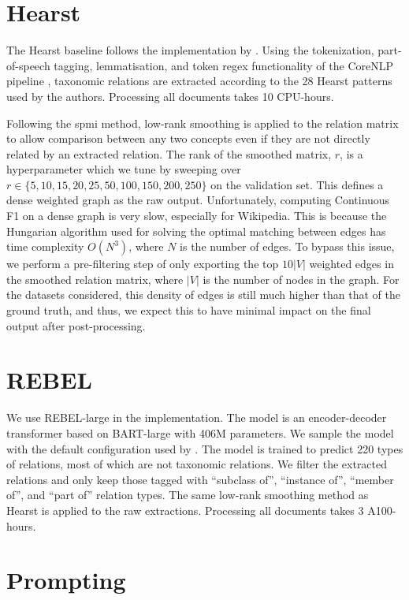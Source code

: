 \section{Hearst}

The Hearst baseline follows the implementation by \citet{roller2018hearst}. Using the tokenization, part-of-speech tagging, lemmatisation, and token regex functionality of the CoreNLP pipeline \cite{manning2014stanford}, taxonomic relations are extracted according to the 28 Hearst patterns used by the authors. Processing all documents takes 10 CPU-hours.

Following the spmi method, low-rank smoothing is applied to the relation matrix to allow comparison between any two concepts even if they are not directly related by an extracted relation. The rank of the smoothed matrix, $r$, is a hyperparameter which we tune by sweeping over $r \in \{5, 10, 15, 20, 25, 50, 100, 150, 200, 250\}$ on the validation set. This defines a dense weighted graph as the raw output. Unfortunately, computing Continuous F1 on a dense graph is very slow, especially for Wikipedia. This is because the Hungarian algorithm used for solving the optimal matching between edges has time complexity $O(N^3)$, where $N$ is the number of edges. To bypass this issue, we perform a pre-filtering step of only exporting the top $10|V|$ weighted edges in the smoothed relation matrix, where $|V|$ is the number of nodes in the graph. For the datasets considered, this density of edges is still much higher than that of the ground truth, and thus, we expect this to have minimal impact on the final output after post-processing.

\section{REBEL}

We use REBEL-large \cite{cabot2021rebel} in the implementation. The model is an encoder-decoder transformer based on BART-large \cite{lewis2019bart} with 406M parameters. We sample the model with the default configuration used by \citet{cabot2021rebel}. The model is trained to predict 220 types of relations, most of which are not taxonomic relations. We filter the extracted relations and only keep those tagged with ``subclass of'', ``instance of'', ``member of'', and ``part of'' relation types. The same low-rank smoothing method as Hearst is applied to the raw extractions. Processing all documents takes 3 A100-hours.

\section{Prompting}

